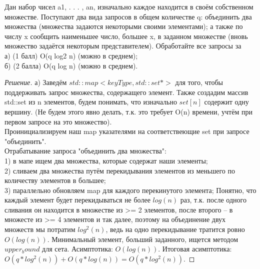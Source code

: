 \documentclass[12pt]{article}
\newenvironment{problem}[2][Задача]{\begin{trivlist}
\item[\hskip \labelsep {\bfseries #1}\hskip \labelsep {\bfseries #2.}]}{\end{trivlist}}
\newenvironment{solution}[0]{\begin{proof}[Решение]}{\end{proof}}
\begin{document}
 
\newpage
\begin{problem}{6}
    Дан набор чисел a1, . . . , an, изначально каждое находится в своём собственном множестве. Поступают
два вида запросов в общем количестве q: объединить два множества (множества задаются некоторыми
своими элементами); а также по числу x сообщить наименьшее число, большее x, в заданном множестве
(вновь множество задаётся некоторым представителем). Обработайте все запросы за
\\а) (1 балл) O(q log2 n) (можно в среднем);
\\б) (2 балла) O(q log n) (можно в среднем).
\end{problem}

\begin{solution}
    а)
    Заведём $std::map <keyType, std::set*>$ для того, чтобы поддерживать запрос множества, содержащего элемент.
    Также создадим массив std::set из n элементов, будем понимать, что изначально $set[n]$ содержит одну вершину.
    (Не будем этого явно делать, т.к. это требует O(n) времени, учтём при первом запросе на это множество).
    \\Проинициализируем наш map указателями на соответствеющие set при запросе "объединить".
    \\Отрабатывание запроса "объединить два множества":
    \\1) в мапе ищем два множества, которые содержат наши элементы;
    \\2) сливаем два множества путём перекидывания элементов из меньшего по количеству элементов в большее;
    \\3) параллельно обновляем map для каждого перекинутого элемента;
    Понятно, что каждый элемент будет перекидываться не более $log(n)$ раз, т.к. после одного сливания
    он находится в множестве из >= 2 элементов, после второго -- в множесте из >= 4 элементов и так далее,
    поэтому на объединение двух множеств мы потратим $log^2(n)$, ведь на одно перекидывание тратится ровно $O(log(n))$.
    Минимальный элемент, больший заданного, ищется методом $upper_bound$ для сета. Асимптотика: $O(log(n))$.
    Итоговая асимптотика: $O(q*log^2(n))+O(q*log(n)) = O(q*log^2(n))$. 

\end{solution}
 
\end{document}
